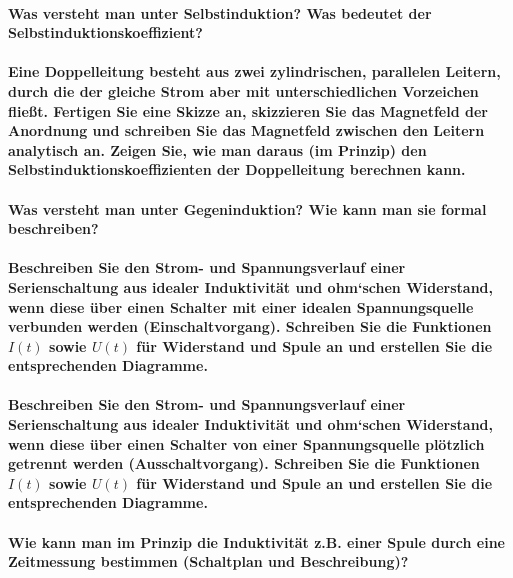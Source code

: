\documentclass[a4paper, 11pt, parskip=half]{scrartcl}
\begin{document}
\paragraph{Was versteht man unter Selbstinduktion? Was bedeutet der Selbstinduktionskoeffizient?}

\paragraph{Eine Doppelleitung besteht aus zwei zylindrischen, parallelen Leitern, durch die der
gleiche Strom aber mit unterschiedlichen Vorzeichen fließt. Fertigen Sie eine Skizze an, skizzieren
Sie das Magnetfeld der Anordnung und schreiben Sie das Magnetfeld zwischen den Leitern analytisch
an. Zeigen Sie, wie man daraus (im Prinzip) den Selbstinduktionskoeffizienten der Doppelleitung
berechnen kann.}

\paragraph{Was versteht man unter Gegeninduktion? Wie kann man sie formal beschreiben?}

\paragraph{Beschreiben Sie den Strom- und Spannungsverlauf einer Serienschaltung aus idealer
Induktivität und ohm‘schen Widerstand, wenn diese über einen Schalter mit einer idealen
Spannungsquelle verbunden werden (Einschaltvorgang). Schreiben Sie die Funktionen $I(t)$ sowie
$U(t)$ für Widerstand und Spule an und erstellen Sie die entsprechenden Diagramme.}

\paragraph{Beschreiben Sie den Strom- und Spannungsverlauf einer Serienschaltung aus idealer
Induktivität und ohm‘schen Widerstand, wenn diese über einen Schalter von einer
Spannungsquelle plötzlich getrennt werden (Ausschaltvorgang). Schreiben Sie die
Funktionen $I(t)$ sowie $U(t)$ für Widerstand und Spule an und erstellen Sie die entsprechenden
Diagramme.}

\paragraph{Wie kann man im Prinzip die Induktivität z.B. einer Spule durch eine Zeitmessung
bestimmen (Schaltplan und Beschreibung)?}
\end{document}
